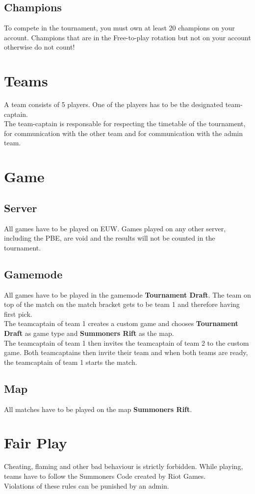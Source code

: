 \documentclass{article}
\begin{document}
\subsection{Champions}
To compete in the tournament, you must own at least 20 champions on your account. Champions that are in the Free-to-play rotation but not on your account otherwise do not count!


\section{Teams}
A team consists of 5 players. One of the players has to be the designated team-captain.
\\
The team-captain is responsable for respecting the timetable of the tournament, for communication with the other team and for communication with the admin team.

\section{Game}
\subsection{Server}
All games have to be played on EUW. Games played on any other server, including the PBE, are void and the results will not be counted in the tournament.

\subsection{Gamemode}
All games have to be played in the gamemode \textbf{Tournament Draft}. The team on top of the match on the match bracket gets to be team 1 and therefore having first pick. 
\\
The teamcaptain of team 1 creates a custom game and chooses \textbf{Tournament Draft} as game type and \textbf{Summoners Rift} as the map.
\\
The teamcaptain of team 1 then invites the teamcaptain of team 2 to the custom game. Both teamcaptains then invite their team and when both teams are ready, the teamcaptain of team 1 starts the match.
\subsection{Map}
All matches have to be played on the map \textbf{Summoners Rift}.

\section{Fair Play}
Cheating, flaming and other bad behaviour is strictly forbidden. While playing, teams have to follow the Summoners Code created by Riot Games.
\\
Violations of these rules can be punished by an admin.
\end{document}
